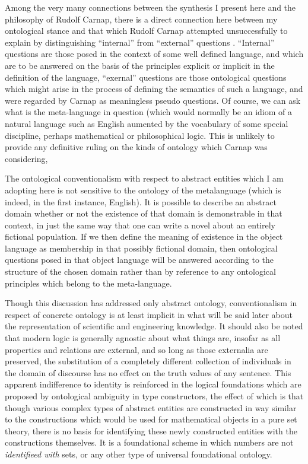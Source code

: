 \documentclass[10pt,titlepage]{book}
\begin{document}
Among the very many connections between the synthesis I present here and the philosophy of Rudolf Carnap, there is a direct connection here between my ontological stance and that which Rudolf Carnap attempted unsuccessfully to explain by distinguishing ``internal'' from ``external'' questions \cite{carnap50}.
``Internal'' questions are those posed in the context of some well defined language, and which are to be answered on the basis of the principles explicit or implicit in the definition of the language, ``exernal'' questions are those ontological questions which might arise in the process of defining the semantics of such a language, and were regarded by Carnap as meaningless pseudo questions.
Of course, we can ask what is the meta-language in question (which would normally be an idiom of a natural language such as English aumented by the vocabulary of some special discipline, perhaps mathematical or philosophical logic.
This is unlikely to provide any definitive ruling on the kinds of ontology which Carnap was considering,

The ontological conventionalism with respect to abstract entities which I am adopting here is not sensitive to the ontology of the metalanguage (which is indeed, in the first instance, English).
It is possible to describe an abstract domain whether or not the existence of that domain is demonstrable in that context, in just the same way that one can write a novel about an entirely fictional population.
If we then define the meaning of existence in the object language as membership in that possibly fictional domain, then ontological questions posed in that object language will be answered according to the structure of the chosen domain rather than by reference to any ontological principles which belong to the meta-language.

Though this discussion has addressed only abstract ontology, conventionalism in respect of concrete ontology is at least implicit in what will be said later about the representation of scientific and engineering knowledge.
It should also be noted that modern logic is generally agnostic about what things are, insofar as all properties and relations are external, and so long as those externalia are preserved, the substitution of a completely different collection of individuals in the domain of discourse has no effect on the truth values of any sentence.
This apparent indifference to identity is reinforced in the logical foundations which are proposed by ontological ambiguity in type constructors, the effect of which is that though various complex types of abstract entities are constructed in way similar to the constructions which would be used for mathematical objects in a pure set theory, there is no basis for identifying these newly constructed entities with the constructions themselves.
It is a foundational scheme in which numbers are not \emph{identifieed with} sets, or any other type of universal foundational ontology.
\end{document}
